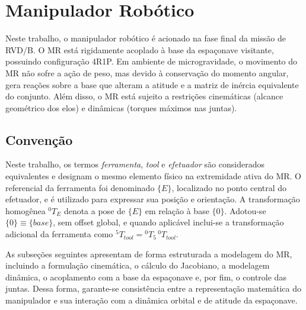 \section{Manipulador Robótico}
\label{sec:manipulador_robotico}

Neste trabalho, o manipulador robótico é acionado na fase final da missão de RVD/B. 
O MR está rigidamente acoplado à base da espaçonave visitante, possuindo configuração 4R1P. 
Em ambiente de microgravidade, o movimento do MR não sofre a ação de peso, mas devido à conservação do momento angular, gera reações sobre a base que alteram a atitude e a matriz de inércia equivalente do conjunto. 
Além disso, o MR está sujeito a restrições cinemáticas (alcance geométrico dos elos) e dinâmicas (torques máximos nas juntas).

\subsection{Convenção}
\label{sec:convencao_mr}

Neste trabalho, os termos \emph{ferramenta}, \emph{tool} e \emph{efetuador} são considerados equivalentes e designam o mesmo elemento físico na extremidade ativa do MR. 
O referencial da ferramenta foi denominado $\{E\}$, localizado no ponto central do efetuador, e é utilizado para expressar sua posição e orientação. 
A transformação homogênea ${}^{0}T_{E}$ denota a pose de $\{E\}$ em relação à base $\{0\}$. 
Adotou-se $\{0\}\equiv\{base\}$, sem offset global, e quando aplicável inclui-se a transformação adicional da ferramenta como ${}^5T_{tool} = {}^0T_{5}\,{}^0T_{tool}$. 

As subseções seguintes apresentam de forma estruturada a modelagem do MR, incluindo a formulação cinemática, o cálculo do Jacobiano, a modelagem dinâmica, o acoplamento com a base da espaçonave e, por fim, o controle das juntas. 
Dessa forma, garante-se consistência entre a representação matemática do manipulador e sua interação com a dinâmica orbital e de atitude da espaçonave.






